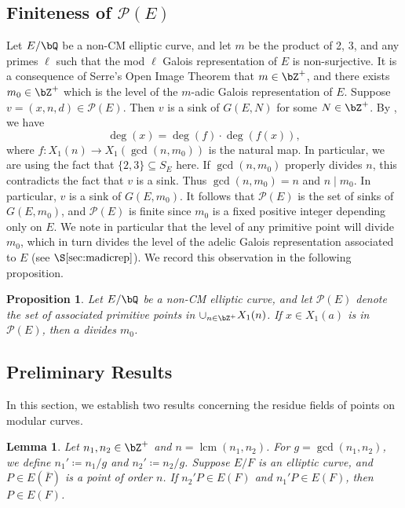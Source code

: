 \documentclass[11pt,reqno]{amsart}
\theoremstyle{plain}
\newtheorem{lemma}[theorem]{Lemma}
\newtheorem{proposition}[theorem]{Proposition}
\theoremstyle{definition}
\DeclareMathOperator{\lcm}{lcm}
\newcommand{\Q}{\bQ}
\newcommand{\Z}{\bZ}
\begin{document}
\subsection{\texorpdfstring{Finiteness of $\mathcal{P}(E)$}{Finiteness of P(E)}} \label{ssec:finiteness of PE} Let $E/\Q$ be a non-CM elliptic curve, and let $m$ be the product of 2, 3, and any primes $\ell$ such that the mod $\ell$ Galois representation of $E$ is non-surjective. It is a consequence of Serre's Open Image Theorem \cite{serre72} that $m \in \Z^+$, and there exists $m_0 \in \Z^+$ which is the level of the $m$-adic Galois representation of $E$. Suppose $v=(x,n,d) \in \mathcal{P}(E)$. Then $v$ is a sink of $G(E,N)$ for some $N \in \Z^+$. By \cite[Theorem~5.1]{BELOV}, we have 
\[
\deg(x)=\deg(f) \cdot \deg(f(x)),
\]
where $f\colon X_1(n) \rightarrow X_1(\gcd(n,m_0))$ is the natural map. 
In particular, we are using the fact that $\{2,3\} \subseteq S_E$ here.
If $\gcd(n,m_0)$ properly divides $n$, this contradicts the fact that $v$ is a sink. Thus $\gcd(n,m_0)=n$ and $n \mid m_0$. In particular, $v$ is a sink of $G(E,m_0)$. It follows that $\mathcal{P}(E)$ is the set of sinks of $G(E,m_0)$, and $\mathcal{P}(E)$ is finite since $m_0$ is a fixed positive integer depending only on $E$. We note in particular that the level of any primitive point will divide $m_0$, which in turn divides the level of the adelic Galois representation associated to $E$ (see $\S \ref{sec:madicrep}$). We record this observation in the following proposition.

\begin{proposition}\label{Rmk:Level}
  Let $E/\Q$ be a non-CM elliptic curve, and let $\mathcal{P}(E)$ denote the set of associated primitive points in $\cup_{n \in \Z^+} X_1(n)$. If $x\in X_1(a)$ is in $\mathcal{P}(E)$, then $a$ divides $m_0$.
\end{proposition}

\subsection{Preliminary Results} In this section, we establish two results concerning the residue fields of points on modular curves.

\begin{lemma}\label{lem:LCM}
Let $n_1,n_2 \in \Z^+$ and $n = \lcm(n_1,n_2)$. For $g=\gcd(n_1,n_2)$, we define $n_1'\coloneqq n_1/g$ and $n_2'\coloneqq n_2/g$.
Suppose $E/F$ is an elliptic curve, and $P \in E(\overline{F})$ is a point of order $n$. If $n_2'P\in E(F)$ and $n_1'P \in E(F)$, then $P \in E(F)$.
\end{lemma}
\end{document}
